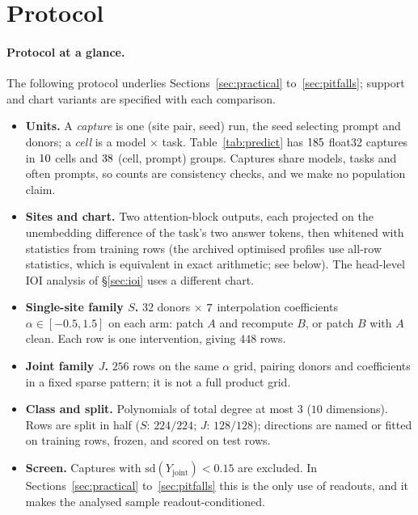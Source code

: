 \section{Protocol}
\label{app:protocol}

\paragraph{Protocol at a glance.} The following protocol underlies Sections~\ref{sec:practical} to~\ref{sec:pitfalls}; support and chart variants are
specified with each comparison.
\begin{itemize}[leftmargin=1.2em,itemsep=1pt,topsep=1pt,parsep=0pt]
\item \textbf{Units.} A \emph{capture} is one (site pair, seed) run, the seed selecting prompt and donors; a
\emph{cell} is a model $\times$ task. Table~\ref{tab:predict} has $185$ float32 captures in $10$ cells and
$38$ (cell, prompt) groups. Captures share models, tasks and often prompts, so counts are consistency
checks, and we make no population claim.
\item \textbf{Sites and chart.} Two attention-block outputs, each projected on the unembedding difference of the
task's two answer tokens, then whitened with statistics from training rows (the archived optimised profiles use
all-row statistics, which is equivalent in exact arithmetic; see below). The head-level IOI analysis of
\S\ref{sec:ioi} uses a different chart.
\item \textbf{Single-site family $S$.} $32$ donors $\times$ $7$ interpolation coefficients $\alpha\in[-0.5,1.5]$
on each arm: patch $A$ and recompute $B$, or patch $B$ with $A$ clean. Each row is one intervention, giving $448$ rows.
\item \textbf{Joint family $J$.} $256$ rows on the same $\alpha$ grid, pairing donors and coefficients in a fixed
sparse pattern; it is not a full product grid.
\item \textbf{Class and split.} Polynomials of total degree at most $3$ ($10$ dimensions). Rows are split in half
($S$: $224/224$; $J$: $128/128$); directions are named or fitted on training rows, frozen, and scored on test rows.
\item \textbf{Screen.} Captures with $\mathrm{sd}(Y_{\mathrm{joint}})<0.15$ are excluded. In
Sections~\ref{sec:practical} to~\ref{sec:pitfalls} this is the only use of readouts, and it makes the analysed sample
readout-conditioned.
\end{itemize}

